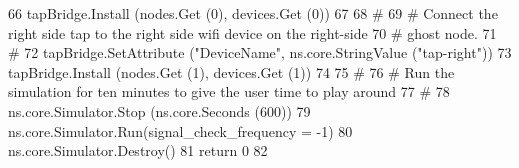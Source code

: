 \begin{DoxyCode}
66     tapBridge.Install (nodes.Get (0), devices.Get (0))
67 
68     \textcolor{comment}{#}
69     \textcolor{comment}{# Connect the right side tap to the right side wifi device on the right-side}
70     \textcolor{comment}{# ghost node.}
71     \textcolor{comment}{#}
72     tapBridge.SetAttribute (\textcolor{stringliteral}{"DeviceName"}, ns.core.StringValue (\textcolor{stringliteral}{"tap-right"}))
73     tapBridge.Install (nodes.Get (1), devices.Get (1))
74 
75     \textcolor{comment}{#}
76     \textcolor{comment}{# Run the simulation for ten minutes to give the user time to play around}
77     \textcolor{comment}{#}
78     ns.core.Simulator.Stop (ns.core.Seconds (600))
79     ns.core.Simulator.Run(signal\_check\_frequency = -1)
80     ns.core.Simulator.Destroy()
81     \textcolor{keywordflow}{return} 0
82 
\end{DoxyCode}
